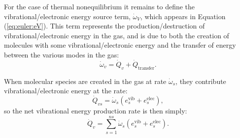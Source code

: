 \documentclass[10pt]{article}
\begin{document}
For the case of thermal nonequilibrium it remains to define the vibrational/electronic energy source term, $\dot{\omega}_V$, which appears in Equation (\ref{eq:euler:eV}).  This term represents the production/destruction of vibrational/electronic energy in the gas, and is due to both the creation of molecules with some vibrational/electronic energy and the transfer of energy between the various modes in the gas:
\begin{equation*}
  \dot{\omega}_v = \dot{Q}_{v} + \dot{Q}_{\text{transfer}}.
\end{equation*}

When molecular species are created in the gas at rate $\dot{\omega}_s$, they contribute vibrational/electronic energy at the rate: 
\begin{equation*}
  \dot{Q}_{vs}=\dot{\omega}_s\left(e^{\text{vib}}_{s} + e^{\text{elec}}_{s}\right),
\end{equation*}
so the net vibrational energy production rate is then simply:
\begin{equation}
  \label{eq:vibrational_energy_production}
  \dot{Q}_{v} = \sum_{s=1}^{ns} \dot{\omega}_s\left(e^{\text{vib}}_{s} + e^{\text{elec}}_{s}\right).
\end{equation}
\end{document}
